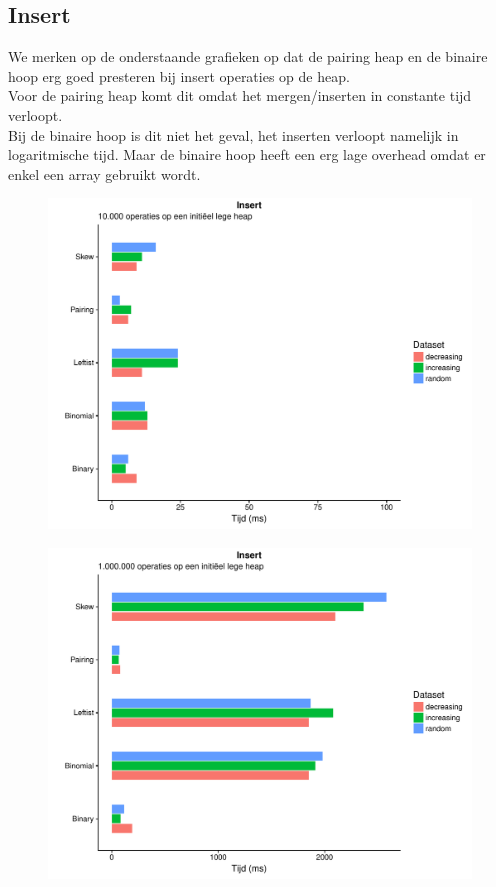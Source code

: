 \documentclass[a4paper,12pt]{report}
\begin{document}
\subsection{Insert}
We merken op de onderstaande grafieken op dat de pairing heap en de binaire hoop erg goed presteren bij insert operaties op de heap. \\
Voor de pairing heap komt dit omdat het mergen/inserten in constante tijd verloopt. \\
Bij de binaire hoop is dit niet het geval, het inserten verloopt namelijk in logaritmische tijd. Maar de binaire hoop heeft een erg lage overhead omdat er enkel een array gebruikt wordt. \\
\begin{figure}[H]
	\includegraphics[scale=0.9]{grafieken/insert_10k}
\end{figure}
\begin{figure}[H]
	\includegraphics[scale=0.9]{grafieken/insert_1mil}
\end{figure}
\end{document}
